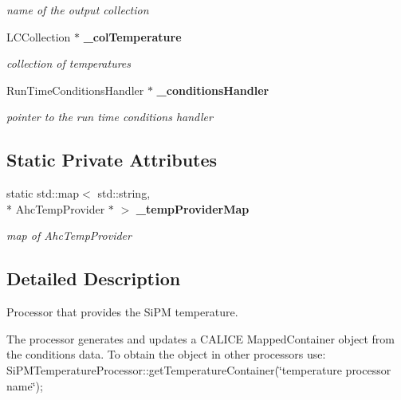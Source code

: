 \begin{DoxyCompactItemize}
\begin{DoxyCompactList}\small\item\em name of the output collection \end{DoxyCompactList}\item 
L\-C\-Collection $\ast$ {\bf \-\_\-col\-Temperature}\label{classCALICE_1_1SiPMTemperatureProcessor_adbf2244effa4e4902692663a4c0f71a8}

\begin{DoxyCompactList}\small\item\em collection of temperatures \end{DoxyCompactList}\item 
Run\-Time\-Conditions\-Handler $\ast$ {\bf \-\_\-conditions\-Handler}\label{classCALICE_1_1SiPMTemperatureProcessor_a40bb02477d3ab8f01a0d5ca7ee1040a8}

\begin{DoxyCompactList}\small\item\em pointer to the run time conditions handler \end{DoxyCompactList}\end{DoxyCompactItemize}
\subsection*{Static Private Attributes}
\begin{DoxyCompactItemize}
\item 
static std\-::map$<$ std\-::string, \\*
Ahc\-Temp\-Provider $\ast$ $>$ {\bf \-\_\-temp\-Provider\-Map}\label{classCALICE_1_1SiPMTemperatureProcessor_ae29d242598f44f0dc52051a3119fbdbe}

\begin{DoxyCompactList}\small\item\em map of Ahc\-Temp\-Provider \end{DoxyCompactList}\end{DoxyCompactItemize}


\subsection{Detailed Description}
Processor that provides the Si\-P\-M temperature. 

The processor generates and updates a C\-A\-L\-I\-C\-E Mapped\-Container object from the conditions data. To obtain the object in other processors use\-: Si\-P\-M\-Temperature\-Processor\-::get\-Temperature\-Container(\char`\"{}temperature processor name\char`\"{});

